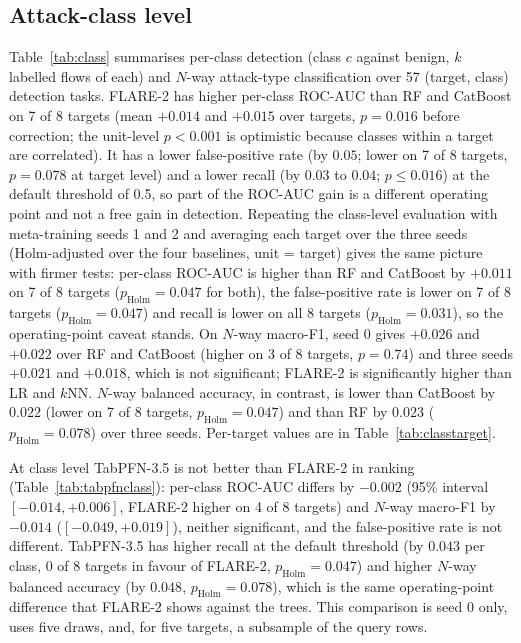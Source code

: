 \documentclass[pdflatex,sn-mathphys-num]{sn-jnl}%
\begin{document}
\subsection{Attack-class level}
Table~\ref{tab:class} summarises per-class detection (class $c$ against benign, $k$ labelled flows of each) and $N$-way attack-type classification over 57 (target, class) detection tasks.
FLARE-2 has higher per-class ROC-AUC than RF and CatBoost on 7 of 8 targets (mean $+0.014$ and $+0.015$ over targets, $p=0.016$ before correction; the unit-level $p<0.001$ is optimistic because classes within a target are correlated).
It has a lower false-positive rate (by $0.05$; lower on 7 of 8 targets, $p=0.078$ at target level) and a lower recall (by $0.03$ to $0.04$; $p\le0.016$) at the default threshold of 0.5, so part of the ROC-AUC gain is a different operating point and not a free gain in detection.
Repeating the class-level evaluation with meta-training seeds 1 and 2 and averaging each target over the three seeds (Holm-adjusted over the four baselines, unit = target) gives the same picture with firmer tests: per-class ROC-AUC is higher than RF and CatBoost by $+0.011$ on 7 of 8 targets ($p_{\text{Holm}}=0.047$ for both), the false-positive rate is lower on 7 of 8 targets ($p_{\text{Holm}}=0.047$) and recall is lower on all 8 targets ($p_{\text{Holm}}=0.031$), so the operating-point caveat stands.
On $N$-way macro-F1, seed 0 gives $+0.026$ and $+0.022$ over RF and CatBoost (higher on 3 of 8 targets, $p=0.74$) and three seeds $+0.021$ and $+0.018$, which is not significant; FLARE-2 is significantly higher than LR and $k$NN.
$N$-way balanced accuracy, in contrast, is lower than CatBoost by $0.022$ (lower on 7 of 8 targets, $p_{\text{Holm}}=0.047$) and than RF by $0.023$ ($p_{\text{Holm}}=0.078$) over three seeds.
Per-target values are in Table~\ref{tab:classtarget}.

At class level TabPFN-3.5 is not better than FLARE-2 in ranking (Table~\ref{tab:tabpfnclass}): per-class ROC-AUC differs by $-0.002$ (95\% interval $[-0.014,+0.006]$, FLARE-2 higher on 4 of 8 targets) and $N$-way macro-F1 by $-0.014$ ($[-0.049,+0.019]$), neither significant, and the false-positive rate is not different.
TabPFN-3.5 has higher recall at the default threshold (by $0.043$ per class, 0 of 8 targets in favour of FLARE-2, $p_{\text{Holm}}=0.047$) and higher $N$-way balanced accuracy (by $0.048$, $p_{\text{Holm}}=0.078$), which is the same operating-point difference that FLARE-2 shows against the trees.
This comparison is seed 0 only, uses five draws, and, for five targets, a subsample of the query rows.
\end{document}
